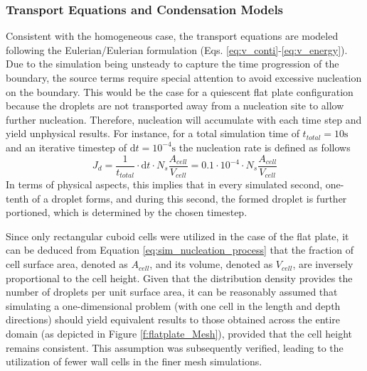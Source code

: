\documentclass[12pt]{article}
\numberwithin{equation}{section}
\begin{document}
\subsubsection{Transport Equations and Condensation Models}\label{sss:Methodology-Heterogeneous-transport}
Consistent with the homogeneous case, the transport equations are modeled following the Eulerian/Eulerian formulation \cite{gerber2004pressure} (Eqs. \ref{eq:v_conti}-\ref{eq:v_energy}). Due to the simulation being unsteady to capture the time progression of the boundary, the source terms require special attention to avoid excessive nucleation on the boundary. This would be the case for a quiescent flat plate configuration because the droplets are not transported away from a nucleation site to allow further nucleation. Therefore, nucleation will accumulate with each time step and yield unphysical results. For instance, for a total simulation time of $t_{total}=10\mathrm{s}$ and an iterative timestep of $\mathrm{d}t=10^{-4}\mathrm{s}$ the nucleation rate is defined as follows 
\begin{equation}\label{eq:sim_nucleation_process}
    J_{d}=\frac{1}{t_{total}}\cdot\mathrm{d}t\cdot N_{s}\frac{A_{cell}}{V_{cell}} =0.1\cdot10^{-4}\cdot N_{s}\frac{A_{cell}}{V_{cell}}
\end{equation}
In terms of physical aspects, this implies that in every simulated second, one-tenth of a droplet forms, and during this second, the formed droplet is further portioned, which is determined by the chosen timestep. 

Since only rectangular cuboid cells were utilized in the case of the flat plate, it can be deduced from Equation \ref{eq:sim_nucleation_process} that the fraction of cell surface area, denoted as $A_{cell}$, and its volume, denoted as $V_{cell}$, are inversely proportional to the cell height. Given that the distribution density provides the number of droplets per unit surface area, it can be reasonably assumed that simulating a one-dimensional problem (with one cell in the length and depth directions) should yield equivalent results to those obtained across the entire domain (as depicted in Figure \ref{f:flatplate_Mesh}), provided that the cell height remains consistent. This assumption was subsequently verified, leading to the utilization of fewer wall cells in the finer mesh simulations.  
\end{document}
